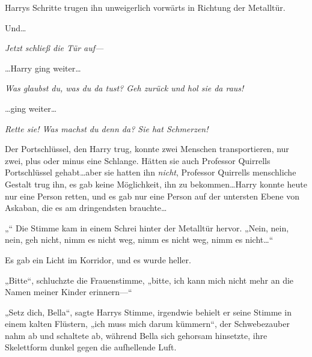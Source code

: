 Harrys Schritte trugen ihn unweigerlich vorwärts in Richtung der Metalltür.

Und…

\emph{Jetzt schließ die Tür auf—}

…Harry ging weiter…

\emph{Was glaubst du, was du da tust? Geh zurück und hol sie da raus!}

…ging weiter…

\emph{Rette sie! Was machst du denn da? Sie hat Schmerzen! }

Der Portschlüssel, den Harry trug, konnte zwei Menschen transportieren, nur zwei, plus oder minus eine Schlange. Hätten sie auch Professor Quirrells Portschlüssel gehabt…aber sie hatten ihn \emph{nicht}, Professor Quirrells menschliche Gestalt trug ihn, es gab keine Möglichkeit, ihn zu bekommen…Harry konnte heute nur eine Person retten, und es gab nur eine Person auf der untersten Ebene von Askaban, die es am dringendsten brauchte…

„“ Die Stimme kam in einem Schrei hinter der Metalltür hervor.
„Nein, nein, nein, geh nicht, nimm es nicht weg, nimm es nicht weg, nimm es nicht…“

Es gab ein Licht im Korridor, und es wurde heller.

„Bitte“, schluchzte die Frauenstimme, „bitte, ich kann mich nicht mehr an die Namen meiner Kinder erinnern—“

„Setz dich, Bella“, sagte Harrys Stimme, irgendwie behielt er seine Stimme in einem kalten Flüstern, „ich muss mich darum kümmern“, der Schwebezauber nahm ab und schaltete ab, während Bella sich gehorsam hinsetzte, ihre Skelettform dunkel gegen die aufhellende Luft.

